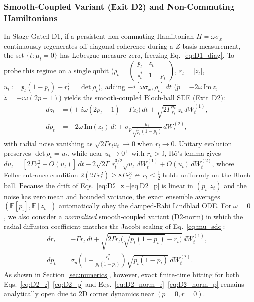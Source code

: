 \documentclass[aps,pra,10pt,twocolumn,superscriptaddress,amsmath,amssymb,floatfix]{revtex4-2}
\newcommand{\E}{\mathbb{E}}
\begin{document}
\subsubsection{Smooth-Coupled Variant (Exit D2) and Non-Commuting Hamiltonians}
In Stage-Gated D1, if a persistent non-commuting Hamiltonian $H = \omega\sigma_x$ continuously regenerates off-diagonal coherence during a $Z$-basis measurement, the set $\{t : \mu_t = 0\}$ has Lebesgue measure zero, freezing Eq.~\eqref{eq:D1_diag}. To probe this regime on a single qubit ($\rho_t = \begin{pmatrix}p_t & z_t \\ z_t^* & 1-p_t\end{pmatrix}$, $r_t = |z_t|$, $u_t := p_t(1-p_t)-r_t^2 = \det\rho_t$), adding $-i[\omega\sigma_x,\rho_t]\,dt$ ($\dot{p} = -2\omega\,\mathrm{Im}\,z$, $\dot{z} = +i\omega(2p-1)$) yields the smooth-coupled Bloch-ball SDE (Exit~D2):
\begin{align}
\label{eq:D2_z}
dz_t &= \bigl(+i\omega(2p_t-1) - \Gamma z_t\bigr)\,dt + \sqrt{2\Gamma\frac{u_t}{r_t}}\,z_t\,dW_t^{(1)}, \\
\label{eq:D2_p}
dp_t &= -2\omega\,\mathrm{Im}(z_t)\,dt + \sigma_p \frac{u_t}{\sqrt{p_t(1-p_t)}}\,dW_t^{(2)},
\end{align}
with radial noise vanishing as $\sqrt{2\Gamma r_t u_t} \to 0$ when $r_t \to 0$. Unitary evolution preserves $\det\rho_t = u_t$, while near $u_t \to 0^+$ with $r_t > 0$, It\^o's lemma gives $du_t = [2\Gamma r_t^2 - O(u_t)]\,dt - 2\sqrt{2\Gamma}\,r_t^{3/2}\sqrt{u_t}\,dW_t^{(1)} + O(u_t)\,dW_t^{(2)}$, whose Feller entrance condition $2(2\Gamma r_t^2) \ge 8\Gamma r_t^3 \iff r_t \le \frac{1}{2}$ holds uniformly on the Bloch ball. Because the drift of Eqs.~\eqref{eq:D2_z}--\eqref{eq:D2_p} is linear in $(p_t, z_t)$ and the noise has zero mean and bounded variance, the exact ensemble averages $(\E[p_t], \E[z_t])$ automatically obey the damped-Rabi Lindblad ODE. For $\omega=0$, we also consider a \emph{normalized} smooth-coupled variant (D2-norm) in which the radial diffusion coefficient matches the Jacobi scaling of Eq.~\eqref{eq:mu_sde}:
\begin{align}
\label{eq:D2_norm_r}
dr_t &= -\Gamma r_t\,dt + \sqrt{2\Gamma r_t\bigl(\sqrt{p_t(1-p_t)} - r_t\bigr)}\,dW_t^{(1)}, \\
\label{eq:D2_norm_p}
dp_t &= \sigma_p\!\left(1 - \frac{r_t^2}{p_t(1-p_t)}\right)\!\sqrt{p_t(1-p_t)}\,dW_t^{(2)}.
\end{align}
As shown in Section~\ref{sec:numerics}, however, exact finite-time hitting for both Eqs.~\eqref{eq:D2_z}--\eqref{eq:D2_p} and Eqs.~\eqref{eq:D2_norm_r}--\eqref{eq:D2_norm_p} remains analytically open due to 2D corner dynamics near $(p=0, r=0)$.
\end{document}
